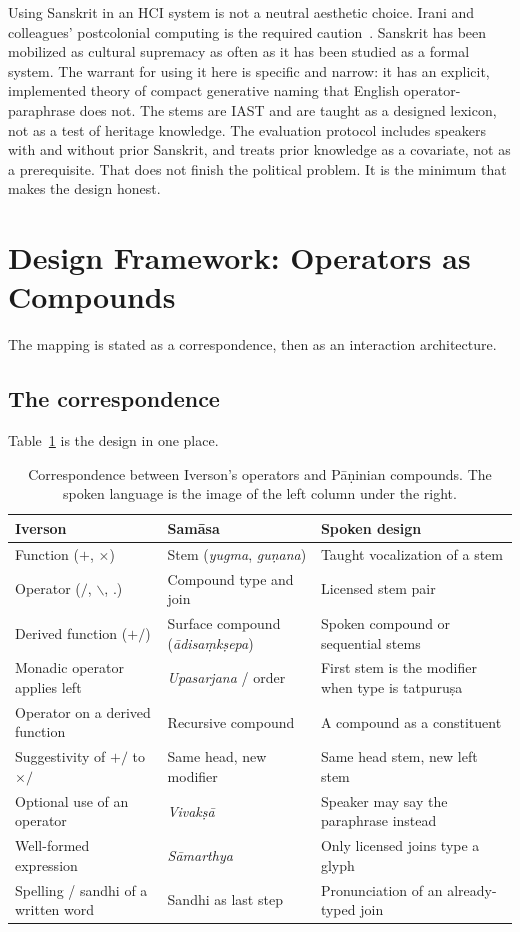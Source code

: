\documentclass[manuscript, review, anonymous]{acmart}
\begin{document}
Using Sanskrit in an HCI system is not a neutral aesthetic choice. Irani and colleagues' postcolonial computing is the required caution~\cite{Irani2010CHI}. Sanskrit has been mobilized as cultural supremacy as often as it has been studied as a formal system. The warrant for using it here is specific and narrow: it has an explicit, implemented theory of compact generative naming that English operator-paraphrase does not. The stems are IAST and are taught as a designed lexicon, not as a test of heritage knowledge. The evaluation protocol includes speakers with and without prior Sanskrit, and treats prior knowledge as a covariate, not as a prerequisite. That does not finish the political problem. It is the minimum that makes the design honest.

\section{Design Framework: Operators as Compounds}
\label{sec:framework}

The mapping is stated as a correspondence, then as an interaction architecture.

\subsection{The correspondence}

Table~\ref{tab:map} is the design in one place.

\begin{table}[t]
\caption{Correspondence between Iverson's operators and P{\=a}{\d{n}}inian compounds. The spoken language is the image of the left column under the right.}
\label{tab:map}
\begin{tabular}{p{}p{}p{}}
\toprule
\textbf{Iverson} & \textbf{Sam{\=a}sa} & \textbf{Spoken design} \\
\midrule
Function ($+$, $\times$) & Stem (\textit{yugma}, \textit{gu{\d{n}}ana}) & Taught vocalization of a stem \\
Operator ($/$, $\backslash$, $.$) & Compound type and join & Licensed stem pair \\
Derived function ($+/$) & Surface compound (\textit{{\=a}disa{\d{m}}k{\d{s}}epa}) & Spoken compound or sequential stems \\
Monadic operator applies left & \textit{Upasarjana} / order & First stem is the modifier when type is tatpuru{\d{s}}a \\
Operator on a derived function & Recursive compound & A compound as a constituent \\
Suggestivity of $+/$ to $\times/$ & Same head, new modifier & Same head stem, new left stem \\
Optional use of an operator & \textit{Vivak{\d{s}}{\=a}} & Speaker may say the paraphrase instead \\
Well-formed expression & \textit{S{\=a}marthya} & Only licensed joins type a glyph \\
Spelling / sandhi of a written word & Sandhi as last step & Pronunciation of an already-typed join \\
\bottomrule
\end{tabular}
\end{table}
\end{document}
